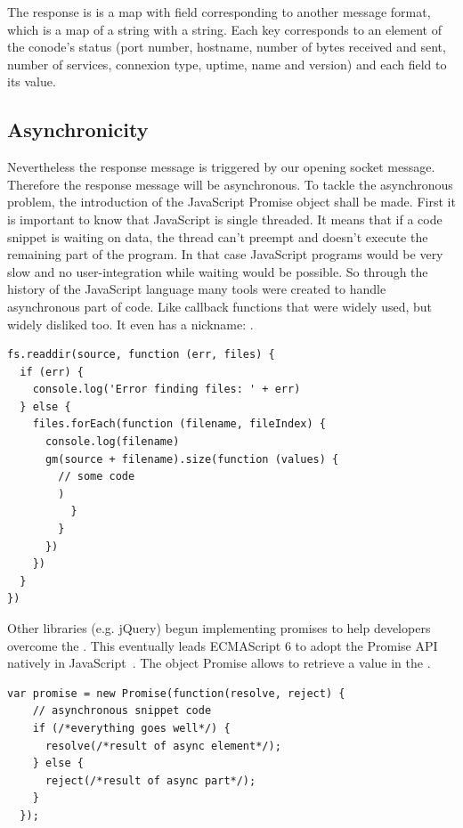\documentclass[11pt, a4paper, twoside, openright, openany]{article} %
\begin{document}
The response is is a map with field corresponding to another message format, which
is a map of a string with a string. Each key corresponds to an element of the conode's
status (port number, hostname, number of bytes received and sent, number of services,
 connexion type, uptime, name and version) and each field to its value.
\bigbreak

\subsection{Asynchronicity}

Nevertheless the response message is triggered by our opening socket message.
Therefore the response message will be asynchronous.
\newline
To tackle the asynchronous problem, the introduction of the JavaScript Promise object shall be made.
First it is important to know that JavaScript is single threaded.
It means that if a code snippet is waiting on data, the thread can't preempt
and doesn't execute the remaining part of the program. In that case JavaScript programs
would be very slow and no user-integration while waiting would be possible.
So through the history of the JavaScript language many tools were
created to handle asynchronous part of code. Like callback functions that were widely
used, but widely disliked too. It even has a nickname: .
\bigbreak

\begin{lstlisting}[caption={Example of Callback Hell with its typical pyramid shape}, captionpos=b]
  fs.readdir(source, function (err, files) {
  if (err) {
    console.log('Error finding files: ' + err)
  } else {
    files.forEach(function (filename, fileIndex) {
      console.log(filename)
      gm(source + filename).size(function (values) {
        // some code
        )
          }
        }
      })
    })
  }
})
\end{lstlisting}

Other libraries (e.g. jQuery) begun implementing promises to help developers overcome the .
This eventually leads ECMAScript 6 to adopt the Promise API~\cite{promise} natively in JavaScript~\cite{ecmaPromise}.
The object Promise allows to retrieve a value in the .
\bigbreak

\begin{lstlisting}[caption={Structure of a Promise}, captionpos=b]
  var promise = new Promise(function(resolve, reject) {
    // asynchronous snippet code
    if (/*everything goes well*/) {
      resolve(/*result of async element*/);
    } else {
      reject(/*result of async part*/);
    }
  });
\end{lstlisting}
\end{document}
